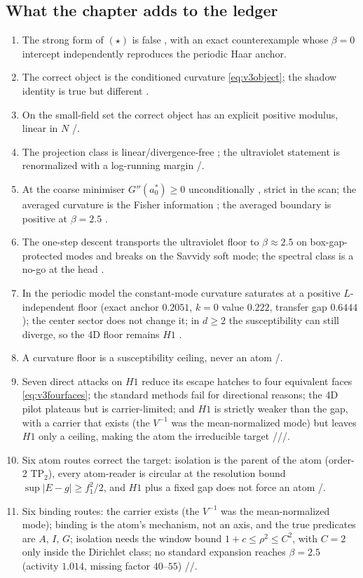 \subsection{What the chapter adds to the ledger}

\begin{enumerate}
\item The strong form of $(\star)$ is false \LN, with an exact counterexample whose $\beta=0$
  intercept independently reproduces the periodic Haar anchor.
\item The correct object is the conditioned curvature \eqref{eq:v3object}; the shadow identity is
  true but different \LT.
\item On the small-field set the correct object has an explicit positive modulus, linear in $N$
  \LT/\LC.
\item The projection class is linear/divergence-free \LT; the ultraviolet statement is renormalized
  with a log-running margin \LT/\LC.
\item At the coarse minimiser $G''(a_0^*)\ge0$ unconditionally \LT, strict in the scan; the averaged
  curvature is the Fisher information \LT; the averaged boundary is positive at $\beta=2.5$ \LE.
\item The one-step descent transports the ultraviolet floor to $\beta\approx2.5$ on
  box-gap-protected modes \LT{} and breaks on the Savvidy soft mode; the spectral class is a no-go at
  the head \LN.
\item In the periodic model the constant-mode curvature saturates at a positive $L$-independent floor
  (exact anchor $0.2051$, $k=0$ value $0.222$, transfer gap $0.6444$); the center sector does not
  change it; in $d\ge2$ the susceptibility can still diverge, so the 4D floor remains $H1$ \LM.
\item A curvature floor is a susceptibility ceiling, never an atom \LT/\LN.
\item Seven direct attacks on $H1$ reduce its escape hatches to four equivalent faces
  \eqref{eq:v3fourfaces}; the standard methods fail for directional reasons; the 4D pilot plateaus but
  is carrier-limited; and $H1$ is strictly weaker than the gap, with a carrier that exists (the
  $V^{-1}$ was the mean-normalized mode) but leaves $H1$ only a ceiling, making the atom the
  irreducible target \LT/\LN/\LE/\LM.
\item Six atom routes correct the target: isolation is the parent of the atom (order-2 TP$_2$),
  every atom-reader is circular at the resolution bound $\sup|E-g|\ge f_1^2/2$, and $H1$ plus a
  fixed gap does not force an atom \LT/\LN.
\item Six binding routes: the carrier exists (the $V^{-1}$ was the mean-normalized mode); binding is
  the atom's mechanism, not an axis, and the true predicates are $A$, $I$, $G$; isolation needs the
  window bound $1+c\le\rho^2\le C^2$, with $C=2$ only inside the Dirichlet class; no standard
  expansion reaches $\beta=2.5$ (activity $1.014$, missing factor $40$--$55$) \LT/\LN/\LM.
\end{enumerate}

